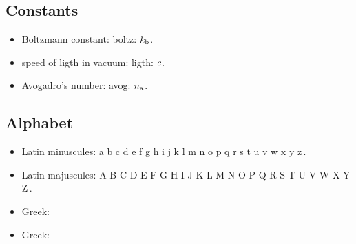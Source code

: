 \begin{multicols}{2}
\subsection{Constants}
\begin{itemize}
\item Boltzmann constant: boltz: $k_\text{b}$.
\item speed of ligth in vacuum: ligth: $c$.
\item Avogadro's number: avog: $n_\text{a}$.
\end{itemize}


\subsection{Alphabet}
\begin{itemize}
\item Latin minuscules:
\beq
a b c d e f g h i j k l m n o p q r s t u v w x y z\,.
\eeq
%
\item Latin majuscules:
\beq
A B C D E F G H I J K L M N O P Q R S T U V W X Y Z\,.
\eeq
%
\item Greek:
\beq
\alpha\beta\gamma\delta\epsilon\varepsilon\zeta\eta\theta\vartheta\iota\kappa\lambda\mu\nu\xi\pi\varpi
\eeq
%
\item Greek:
\beq
\rho\varrho\sigma\varsigma\tau\upsilon\phi\varphi\chi\psi\omega\Gamma\Delta\Theta\Lambda\Xi\Pi\Sigma\Upsilon\Phi\Psi\Omega
\eeq
\end{itemize}

\end{multicols}

